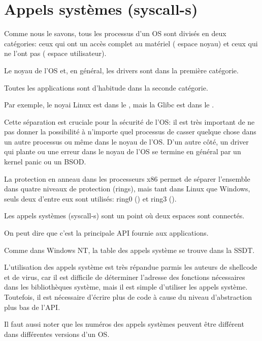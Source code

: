\section{Appels systèmes (syscall-s)}

\label{syscalls}

Comme nous le savons, tous les processus d'un \ac{OS} sont divisés en deux catégories:
ceux qui ont un accès complet au matériel ( espace noyau)
et ceux qui ne l'ont pas ( espace utilisateur).

Le noyau de l'OS et, en général, les drivers sont dans la première catégorie.

Toutes les applications sont d'habitude dans la seconde catégorie.

Par exemple, le noyai Linux est dans le , mais la Glibc est dans
le .

Cette séparation est cruciale pour la sécurité de l'\ac{OS}: il est très important
de ne pas donner la possibilité à n'importe quel processus de casser quelque chose
dans un autre processus ou même dans le noyau de l'\ac{OS}.
D'un autre côté, un driver qui plante ou une erreur dans le noyau de l'\ac{OS} se
termine en général par un kernel panic ou un \ac{BSOD}.

La protection en anneau dans les processeurs x86 permet de séparer l'ensemble dans
quatre niveaux de protection (rings), mais tant dans Linux que Windows, seuls deux
d'entre eux sont utilisés: ring0 () et ring3 ().

Les appels systèmes (syscall-s) sont un point où deux espaces sont connectés.

On peut dire que c'est la principale \ac{API} fournie aux applications.

Comme dans \gls{Windows NT}, la table des appels système se trouve dans la \ac{SSDT}.


L'utilisation des appels système est très répandue parmis les auteurs de shellcode
et de virus, car il est difficile de déterminer l'adresse des fonctions nécessaires
dans les bibliothèques système, mais il est simple d'utiliser les appels système.
Toutefois, il est nécessaire d'écrire plus de code à cause du niveau d'abstraction
plus bas de l'\ac{API}.

Il faut aussi noter que les numéros des appels systèmes peuvent être différent dans
différentes versions d'un OS.

